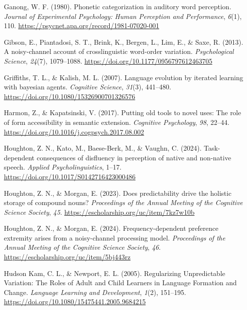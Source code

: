 \documentclass[
  12pt,
]{scrartcl}
\newlength{\cslhangindent}
\newenvironment{CSLReferences}[2] %
 {\begin{list}{}{%
  \setlength{\itemindent}{0pt}
  \setlength{\leftmargin}{0pt}
  \setlength{\parsep}{0pt}
  \ifodd #1
   \setlength{\leftmargin}{\cslhangindent}
   \setlength{\itemindent}{-1\cslhangindent}
  \fi
  \setlength{\itemsep}{#2\baselineskip}}}
 {\end{list}}
\begin{document}
\begin{CSLReferences}{1}{0}
Ganong, W. F. (1980). Phonetic categorization in auditory word
perception. \emph{Journal of Experimental Psychology: Human Perception
and Performance}, \emph{6}(1), 110.
\url{https://psycnet.apa.org/record/1981-07020-001}

Gibson, E., Piantadosi, S. T., Brink, K., Bergen, L., Lim, E., \& Saxe,
R. (2013). A noisy-channel account of crosslinguistic word-order
variation. \emph{Psychological Science}, \emph{24}(7), 1079--1088.
\url{https://doi.org/10.1177/0956797612463705}

Griffiths, T. L., \& Kalish, M. L. (2007). Language evolution by
iterated learning with bayesian agents. \emph{Cognitive Science},
\emph{31}(3), 441--480. \url{https://doi.org/10.1080/15326900701326576}

Harmon, Z., \& Kapatsinski, V. (2017). Putting old tools to novel uses:
The role of form accessibility in semantic extension. \emph{Cognitive
Psychology}, \emph{98}, 22--44.
\url{https://doi.org/10.1016/j.cogpsych.2017.08.002}

Houghton, Z. N., Kato, M., Baese-Berk, M., \& Vaughn, C. (2024).
Task-dependent consequences of disfluency in perception of native and
non-native speech. \emph{Applied Psycholinguistics}, 1--17.
\url{https://doi.org/10.1017/S0142716423000486}

Houghton, Z. N., \& Morgan, E. (2023). Does predictability drive the
holistic storage of compound nouns? \emph{Proceedings of the Annual
Meeting of the Cognitive Science Society}, \emph{45}.
\url{https://escholarship.org/uc/item/7kz7w10b}

Houghton, Z. N., \& Morgan, E. (2024). Frequency-dependent preference
extremity arises from a noisy-channel processing model.
\emph{Proceedings of the Annual Meeting of the Cognitive Science
Society}, \emph{46}. \url{https://escholarship.org/uc/item/5bj443rz}

Hudson Kam, C. L., \& Newport, E. L. (2005). Regularizing Unpredictable
Variation: The Roles of Adult and Child Learners in Language Formation
and Change. \emph{Language Learning and Development}, \emph{1}(2),
151--195. \url{https://doi.org/10.1080/15475441.2005.9684215}


\end{CSLReferences}
\end{document}
